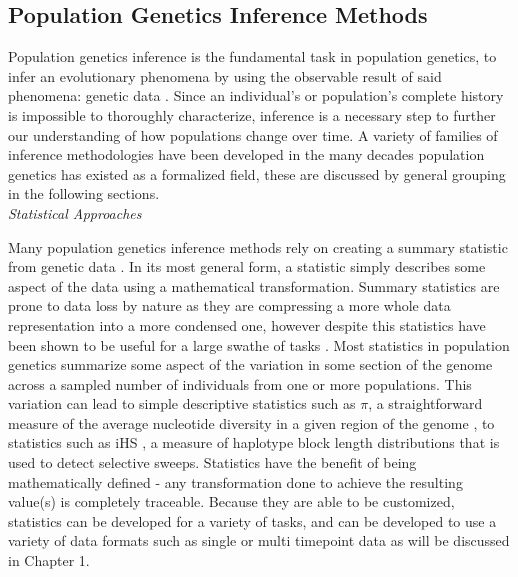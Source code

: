 \subsection{Population Genetics Inference Methods}

Population genetics inference is the fundamental task in population genetics, to infer an evolutionary phenomena by using the observable result of said phenomena: genetic data \cite{sheehanDeepLearningPopulation2016, flagelUnreasonableEffectivenessConvolutional2019}. Since an individual’s or population’s complete history is impossible to thoroughly characterize, inference is a necessary step to further our understanding of how populations change over time. A variety of families of inference methodologies have been developed in the many decades population genetics has existed as a formalized field, these are discussed by general grouping in the following sections. \\

\noindent \textit{Statistical Approaches}

Many population genetics inference methods rely on creating a summary statistic from genetic data \cite{hejaseSummaryStatisticsGene2020}. In its most general form, a statistic simply describes some aspect of the data using a mathematical transformation. Summary statistics are prone to data loss by nature as they are compressing a more whole data representation into a more condensed one, however despite this statistics have been shown to be useful for a large swathe of tasks \cite{arnabUncoveringFootprintsNatural2022, federIdentifyingSignaturesSelection2014, liNewTestDetecting2011, jensenDistinguishingSelectiveSweeps2005, nielsenGenomicScansSelective2005}. Most statistics in population genetics summarize some aspect of the variation in some section of the genome across a sampled number of individuals from one or more populations. This variation can lead to simple descriptive statistics such as $\pi$, a straightforward measure of the average nucleotide diversity in a given region of the genome \cite{neiDNAPolymorphismDetectable1981, neiMathematicalModelStudying1979}, to statistics such as iHS \cite{voightMapRecentPositive2006}, a measure of haplotype block length distributions that is used to detect selective sweeps. Statistics have the benefit of being mathematically defined - any transformation done to achieve the resulting value(s) is completely traceable. Because they are able to be customized, statistics can be developed for a variety of tasks, and can be developed to use a variety of data formats such as single or multi timepoint data as will be discussed in Chapter 1. \\

